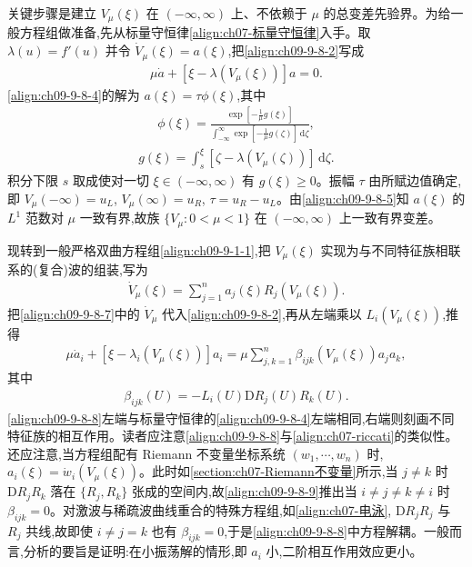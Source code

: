 \documentclass[../../main.tex]{subfiles}
\begin{document}
关键步骤是建立 $V_{\mu}(\xi)$ 在 $(-\infty,\infty)$ 上、不依赖于 $\mu$ 的总变差先验界。为给一般方程组做准备,先从标量守恒律\eqref{align:ch07-标量守恒律}入手。取 $\lambda(u)=f'(u)$ 并令 $\dot{V}_{\mu}(\xi)=a(\xi)$,把\eqref{align:ch09-9-8-2}写成
\begin{align}
\mu\dot{a}+[\xi-\lambda(V_{\mu}(\xi))]a=0.
\label{align:ch09-9-8-4}
\end{align}
\eqref{align:ch09-9-8-4}的解为 $a(\xi)=\tau\phi(\xi)$,其中
\begin{align}
\phi(\xi)=\frac{\exp[-\frac{1}{\mu}g(\xi)]}{\int_{-\infty}^{\infty}\exp[-\frac{1}{\mu}g(\zeta)]\,\mathrm{d}\zeta},
\label{align:ch09-9-8-5}
\end{align}
\begin{align}
g(\xi)=\int_{s}^{\xi}[\zeta-\lambda(V_{\mu}(\zeta))]\,\mathrm{d}\zeta.
\label{align:ch09-9-8-6}
\end{align}
积分下限 $s$ 取成使对一切 $\xi\in(-\infty,\infty)$ 有 $g(\xi)\geqslant0$。振幅 $\tau$ 由所赋边值确定,即 $V_{\mu}(-\infty)=u_{L}$, $V_{\mu}(\infty)=u_{R}$, $\tau=u_{R}-u_{L}$。由\eqref{align:ch09-9-8-5}知 $a(\xi)$ 的 $L^{1}$ 范数对 $\mu$ 一致有界,故族 $\{V_{\mu}:0<\mu<1\}$ 在 $(-\infty,\infty)$ 上一致有界变差。

现转到一般严格双曲方程组\eqref{align:ch09-9-1-1},把 $V_{\mu}(\xi)$ 实现为与不同特征族相联系的(复合)波的组装,写为
\begin{align}
\dot{V}_{\mu}(\xi)=\sum_{j=1}^{n}a_{j}(\xi)R_{j}(V_{\mu}(\xi)).
\label{align:ch09-9-8-7}
\end{align}
把\eqref{align:ch09-9-8-7}中的 $\dot{V}_{\mu}$ 代入\eqref{align:ch09-9-8-2},再从左端乘以 $L_{i}(V_{\mu}(\xi))$,推得
\begin{align}
\mu\dot{a}_{i}+[\xi-\lambda_{i}(V_{\mu}(\xi))]a_{i}=\mu\sum_{j,k=1}^{n}\beta_{ijk}(V_{\mu}(\xi))a_{j}a_{k},
\label{align:ch09-9-8-8}
\end{align}
其中
\begin{align}
\beta_{ijk}(U)=-L_{i}(U)\mathrm{D}R_{j}(U)R_{k}(U).
\label{align:ch09-9-8-9}
\end{align}
\eqref{align:ch09-9-8-8}左端与标量守恒律的\eqref{align:ch09-9-8-4}左端相同,右端则刻画不同特征族的相互作用。读者应注意\eqref{align:ch09-9-8-8}与\eqref{align:ch07-riccati}的类似性。还应注意,当方程组配有 Riemann 不变量坐标系统 $(w_{1},\cdots ,w_{n})$ 时, $a_{i}(\xi)=\dot{w}_{i}(V_{\mu}(\xi))$。此时如\cref{section:ch07-Riemann不变量}所示,当 $j\neq k$ 时 $\mathrm{D}R_{j}R_{k}$ 落在 $\{R_{j},R_{k}\}$ 张成的空间内,故\eqref{align:ch09-9-8-9}推出当 $i\neq j\neq k\neq i$ 时 $\beta_{ijk}=0$。对激波与稀疏波曲线重合的特殊方程组,如\eqref{align:ch07-电泳}, $\mathrm{D}R_{j}R_{j}$ 与 $R_{j}$ 共线,故即使 $i\neq j=k$ 也有 $\beta_{ijk}=0$,于是\eqref{align:ch09-9-8-8}中方程解耦。一般而言,分析的要旨是证明:在小振荡解的情形,即 $a_{i}$ 小,二阶相互作用效应更小。
\end{document}
